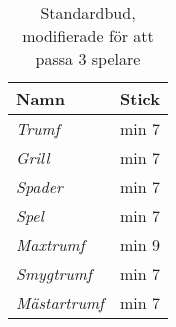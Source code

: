 %
%
%

\begin{table}
	\caption{Standardbud, modifierade för att passa $3$ spelare}\label{tab:standardBids3}
	\begin{center}
		\begin{tabular}{l|c}
			\textbf{Namn} & \textbf{Stick}
			\\ \hline
			\textit{Trumf} & min 7 \\
			\textit{Grill} & min 7 \\
			\textit{Spader} & min 7 \\
			\textit{Spel} & min 7 \\
			\textit{Maxtrumf} & min 9 \\
			\textit{Smygtrumf} & min 7 \\
			\textit{Mästartrumf} & min 7
		\end{tabular}
	\end{center}
\end{table}
